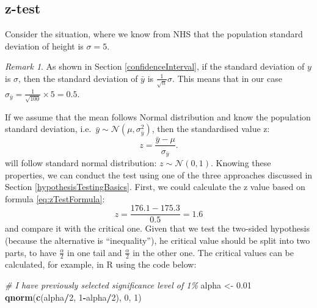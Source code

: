 \documentclass[
]{book}
\newenvironment{Shaded}{\begin{snugshade}}{\end{snugshade}}
\newcommand{\CommentTok}[1]{\textcolor[rgb]{0.56,0.35,0.01}{\textit{#1}}}
\newcommand{\DecValTok}[1]{\textcolor[rgb]{0.00,0.00,0.81}{#1}}
\newcommand{\FloatTok}[1]{\textcolor[rgb]{0.00,0.00,0.81}{#1}}
\newcommand{\KeywordTok}[1]{\textcolor[rgb]{0.13,0.29,0.53}{\textbf{#1}}}
\newcommand{\NormalTok}[1]{#1}
\newcommand{\OperatorTok}[1]{\textcolor[rgb]{0.81,0.36,0.00}{\textbf{#1}}}
\newcommand{\StringTok}[1]{\textcolor[rgb]{0.31,0.60,0.02}{#1}}
\theoremstyle{definition}
\theoremstyle{definition}
\theoremstyle{definition}
\theoremstyle{definition}
\theoremstyle{remark}
\newtheorem*{remark}{Remark}
\begin{document}
\hypertarget{statisticalTestsOneSampleMeanZ}{%
\subsection{z-test}\label{statisticalTestsOneSampleMeanZ}}

Consider the situation, where we know from NHS that the population standard deviation of height is \(\sigma=5\).

\begin{remark}
As shown in Section \ref{confidenceInterval}, if the standard deviation of \(y\) is \(\sigma\), then the standard deviation of \(\bar{y}\) is \(\frac{1}{\sqrt{n}} \sigma\). This means that in our case \(\sigma_{\bar{y}}=\frac{1}{\sqrt{100}} \times 5 =0.5\).
\end{remark}

If we assume that the mean follows Normal distribution and know the population standard deviation, i.e.~\(\bar{y} \sim \mathcal{N}\left(\mu, \sigma^2_{\bar{y}}\right)\), then the standardised value z:
\begin{equation}
    z = \frac{\bar{y}-\mu}{\sigma_{\bar{y}}} .
    \label{eq:zTestFormula}
\end{equation}
will follow standard normal distribution: \(z \sim \mathcal{N}\left(0, 1\right)\). Knowing these properties, we can conduct the test using one of the three approaches discussed in Section \ref{hypothesisTestingBasics}. First, we could calculate the z value based on formula \eqref{eq:zTestFormula}:
\begin{equation*}
    z = \frac{176.1 -175.3}{0.5} = 1.6 
\end{equation*}
and compare it with the critical one. Given that we test the two-sided hypothesis (because the alternative is ``inequality''), he critical value should be split into two parts, to have \(\frac{\alpha}{2}\) in one tail and \(\frac{\alpha}{2}\) in the other one. The critical values can be calculated, for example, in R using the code below:

\begin{Shaded}
\begin{Highlighting}[]
\CommentTok{\# I have previously selected significance level of 1\%}
\NormalTok{alpha \textless{}{-}}\StringTok{ }\FloatTok{0.01}
\KeywordTok{qnorm}\NormalTok{(}\KeywordTok{c}\NormalTok{(alpha}\OperatorTok{/}\DecValTok{2}\NormalTok{, }\DecValTok{1}\OperatorTok{{-}}\NormalTok{alpha}\OperatorTok{/}\DecValTok{2}\NormalTok{), }\DecValTok{0}\NormalTok{, }\DecValTok{1}\NormalTok{)}
\end{Highlighting}
\end{Shaded}
\end{document}
